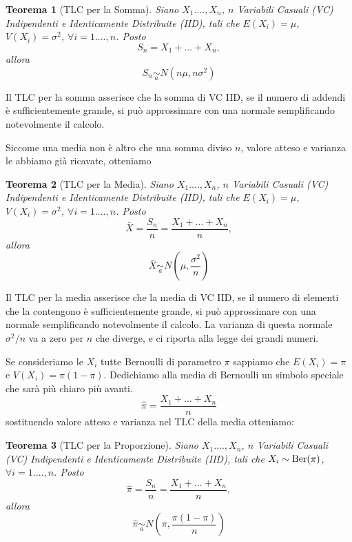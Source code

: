 \documentclass[
  11pt,
]{book}
\theoremstyle{mytheoremstyle}
\newtheorem{theorem}{Teorema}[section]
\theoremstyle{mydefstyle}
\begin{document}
\begin{info}

\begin{theorem}[TLC per la Somma]
Siano \(X_1....,X_n\), \(n\) Variabili Casuali (VC) Indipendenti e
Identicamente Distribuite (IID), tali che \(E(X_i)=\mu\),
\(V(X_i)=\sigma^2\), \(\forall i=1....,n\). Posto \[S_n=X_1+...+X_n,\]
allora \[S_n\operatorname*{\sim}_{a} N\left(n\mu,n\sigma^2\right)\]
\end{theorem}

\end{info}

Il TLC per la somma asserisce che la somma di VC IID, se il numero di
addendi è sufficientemente grande, si può approssimare con una normale
semplificando notevolmente il calcolo.

Siccome una media non è altro che una somma diviso \(n\), valore atteso e
varianza le abbiamo già ricavate, otteniamo

\begin{info}

\begin{theorem}[TLC per la Media]
Siano \(X_1....,X_n\), \(n\) Variabili Casuali (VC) Indipendenti e
Identicamente Distribuite (IID), tali che \(E(X_i)=\mu\),
\(V(X_i)=\sigma^2\), \(\forall i=1....,n\). Posto
\[\bar X =\frac {S_n} n = \frac{X_1+...+X_n}n,\] allora
\[\bar X\operatorname*{\sim}_{a} N\left(\mu,\frac{\sigma^2}n\right)\]
\end{theorem}

\end{info}

Il TLC per la media asserisce che la media di VC IID, se il numero di
elementi che la contengono è sufficientemente grande, si può
approssimare con una normale semplificando notevolmente il calcolo. La
varianza di questa normale \(\sigma^2/n\) va a zero per \(n\) che diverge, e
ci riporta alla legge dei grandi numeri.

Se consideriamo le \(X_i\) tutte Bernoulli di parametro \(\pi\) sappiamo che
\(E(X_i)=\pi\) e \(V(X_i)=\pi(1-\pi)\). Dedichiamo alla media di Bernoulli
un simbolo speciale che sarà più chiaro più avanti.
\[\hat \pi=\frac{X_1+...+X_n}{n}\] sostituendo valore atteso e varianza
nel TLC della media otteniamo:

\begin{info}

\begin{theorem}[TLC per la Proporzione]
Siano \(X_1....,X_n\), \(n\) Variabili Casuali (VC) Indipendenti e
Identicamente Distribuite (IID), tali che \(X_i\sim\text{\rm Ber}(\pi)\),
\(\forall i=1....,n\). Posto
\[\hat\pi =\frac {S_n} n = \frac{X_1+...+X_n}n,\] allora
\[\hat\pi\operatorname*{\sim}_{a} N\left(\pi,\frac{\pi(1-\pi)}n\right)\]
\end{theorem}

\end{info}
\end{document}

